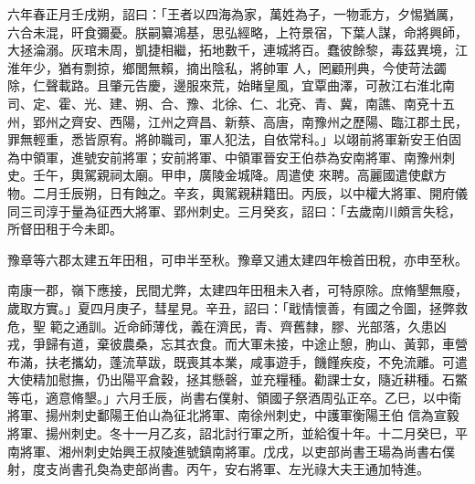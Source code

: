 \begin{pinyinscope}
 六年春正月壬戌朔，詔曰：「王者以四海為家，萬姓為子，一物乖方，夕惕猶厲，六合未混，旰食彌憂。朕嗣纂鴻基，思弘經略，上符景宿，下葉人謀，命將興師，大拯淪溺。灰琯未周，凱捷相繼，拓地數千，連城將百。蠢彼餘黎，毒茲異境，江淮年少，猶有剽掠，鄉閭無賴，摘出陰私，將帥軍
 人，罔顧刑典，今使苛法蠲除，仁聲載路。且肇元告慶，邊服來荒，始睹皇風，宜覃曲澤，可赦江右淮北南司、定、霍、光、建、朔、合、豫、北徐、仁、北兗、青、冀，南譙、南兗十五州，郢州之齊安、西陽，江州之齊昌、新蔡、高唐，南豫州之歷陽、臨江郡土民，罪無輕重，悉皆原宥。將帥職司，軍人犯法，自依常科。」以翊前將軍新安王伯固為中領軍，進號安前將軍；安前將軍、中領軍晉安王伯恭為安南將軍、南豫州刺史。壬午，輿駕親祠太廟。甲申，廣陵金城降。周遣使
 來聘。高麗國遣使獻方物。二月壬辰朔，日有蝕之。辛亥，輿駕親耕籍田。丙辰，以中權大將軍、開府儀同三司淳于量為征西大將軍、郢州刺史。三月癸亥，詔曰：「去歲南川頗言失稔，所督田租于今未即。



 豫章等六郡太建五年田租，可申半至秋。豫章又逋太建四年檢首田稅，亦申至秋。



 南康一郡，嶺下應接，民間尤弊，太建四年田租未入者，可特原除。庶脩墾無廢，歲取方實。」夏四月庚子，彗星見。辛丑，詔曰：「戢情懷善，有國之令圖，拯弊救危，聖
 範之通訓。近命師薄伐，義在濟民，青、齊舊隸，膠、光部落，久患凶戎，爭歸有道，棄彼農桑，忘其衣食。而大軍未接，中途止憩，朐山、黃郭，車營布滿，扶老攜幼，蓬流草跋，既喪其本業，咸事遊手，饑饉疾疫，不免流離。可遣大使精加慰撫，仍出陽平倉穀，拯其懸磬，並充糧種。勸課士女，隨近耕種。石鱉等屯，適意脩墾。」六月壬辰，尚書右僕射、領國子祭酒周弘正卒。乙巳，以中衛將軍、揚州刺史鄱陽王伯山為征北將軍、南徐州刺史，中護軍衡陽王伯
 信為宣毅將軍、揚州刺史。冬十一月乙亥，詔北討行軍之所，並給復十年。十二月癸巳，平南將軍、湘州刺史始興王叔陵進號鎮南將軍。戊戌，以吏部尚書王瑒為尚書右僕射，度支尚書孔奐為吏部尚書。丙午，安右將軍、左光祿大夫王通加特進。




\end{pinyinscope}
